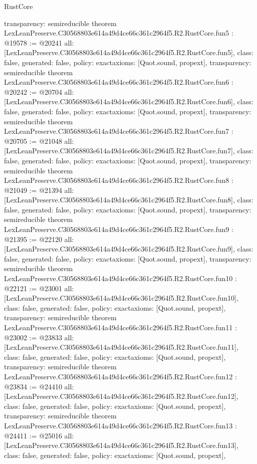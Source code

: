 \begin{lexlean}{RustCore}
\begin{coremodule}
{  transparency: semireducible
}
theorem LexLeanPreserve.C30568803e614a49d4ce66c361c2964f5.R2.RustCore.fun5 : @19578 := @20241 {
  all: [LexLeanPreserve.C30568803e614a49d4ce66c361c2964f5.R2.RustCore.fun5],
  class: false,
  generated: false,
  policy: exact{axioms: [Quot.sound, propext]},
  transparency: semireducible
}
theorem LexLeanPreserve.C30568803e614a49d4ce66c361c2964f5.R2.RustCore.fun6 : @20242 := @20704 {
  all: [LexLeanPreserve.C30568803e614a49d4ce66c361c2964f5.R2.RustCore.fun6],
  class: false,
  generated: false,
  policy: exact{axioms: [Quot.sound, propext]},
  transparency: semireducible
}
theorem LexLeanPreserve.C30568803e614a49d4ce66c361c2964f5.R2.RustCore.fun7 : @20705 := @21048 {
  all: [LexLeanPreserve.C30568803e614a49d4ce66c361c2964f5.R2.RustCore.fun7],
  class: false,
  generated: false,
  policy: exact{axioms: [Quot.sound, propext]},
  transparency: semireducible
}
theorem LexLeanPreserve.C30568803e614a49d4ce66c361c2964f5.R2.RustCore.fun8 : @21049 := @21394 {
  all: [LexLeanPreserve.C30568803e614a49d4ce66c361c2964f5.R2.RustCore.fun8],
  class: false,
  generated: false,
  policy: exact{axioms: [Quot.sound, propext]},
  transparency: semireducible
}
theorem LexLeanPreserve.C30568803e614a49d4ce66c361c2964f5.R2.RustCore.fun9 : @21395 := @22120 {
  all: [LexLeanPreserve.C30568803e614a49d4ce66c361c2964f5.R2.RustCore.fun9],
  class: false,
  generated: false,
  policy: exact{axioms: [Quot.sound, propext]},
  transparency: semireducible
}
theorem LexLeanPreserve.C30568803e614a49d4ce66c361c2964f5.R2.RustCore.fun10 : @22121 := @23001 {
  all: [LexLeanPreserve.C30568803e614a49d4ce66c361c2964f5.R2.RustCore.fun10],
  class: false,
  generated: false,
  policy: exact{axioms: [Quot.sound, propext]},
  transparency: semireducible
}
theorem LexLeanPreserve.C30568803e614a49d4ce66c361c2964f5.R2.RustCore.fun11 : @23002 := @23833 {
  all: [LexLeanPreserve.C30568803e614a49d4ce66c361c2964f5.R2.RustCore.fun11],
  class: false,
  generated: false,
  policy: exact{axioms: [Quot.sound, propext]},
  transparency: semireducible
}
theorem LexLeanPreserve.C30568803e614a49d4ce66c361c2964f5.R2.RustCore.fun12 : @23834 := @24410 {
  all: [LexLeanPreserve.C30568803e614a49d4ce66c361c2964f5.R2.RustCore.fun12],
  class: false,
  generated: false,
  policy: exact{axioms: [Quot.sound, propext]},
  transparency: semireducible
}
theorem LexLeanPreserve.C30568803e614a49d4ce66c361c2964f5.R2.RustCore.fun13 : @24411 := @25016 {
  all: [LexLeanPreserve.C30568803e614a49d4ce66c361c2964f5.R2.RustCore.fun13],
  class: false,
  generated: false,
  policy: exact{axioms: [Quot.sound, propext]},
}
\end{coremodule}
\end{lexlean}
